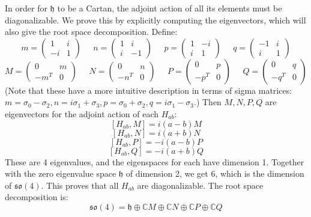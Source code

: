 \documentclass[12 pt]{article}
\newcommand{\C}{\mathbb{C}}
\newcommand{\fr}{\mathfrak}
\begin{document}
In order for $\fr h$ to be a Cartan, the adjoint action of all its elements must be diagonalizable. We prove this by explicitly computing the eigenvectors, which will also give the root space decomposition. Define:
\[         m =  \left(  \begin{array} {cc}  1 & i \\ -i & 1  \end{array} \right)  \;\;\;\;\;  n = \left(  \begin{array} {cc}  1 & i \\ i &-1  \end{array} \right)  \;\;\;\;\;      p =  \left(  \begin{array} {cc}  1 & -i \\ i & 1  \end{array} \right)  \;\;\;\;\;  q = \left(  \begin{array} {cc}  -1 & i \\ i & 1  \end{array} \right) \]
\[      M =  \left(  \begin{array} {cc}  0 & m \\ -m^T & 0  \end{array} \right)  \;\;\;\;\;   N =  \left(  \begin{array} {cc}  0 & n \\ -n^T & 0  \end{array} \right)  \;\;\;\;\;  P =  \left(  \begin{array} {cc}  0 & p \\ -p^T & 0  \end{array} \right)  \;\;\;\;\;  Q =  \left(  \begin{array} {cc}  0 & q \\ -q^T & 0  \end{array} \right)  \;\;\;\;\; \]
(Note that these have a more intuitive description in terms of sigma matrices: $m = \sigma_0 - \sigma_2 , n = i \sigma_1 + \sigma_3, p =  \sigma_0 + \sigma_2, q = i \sigma_1 - \sigma_3$.) Then $M, N, P, Q$ are eigenvectors for the adjoint action of each $H_{ab}$:
\[       [H_{ab}, M] = i (a-b) M      \]
\[       [H_{ab}, N] = i (a+b) N      \]
\[       [H_{ab}, P] = -i (a-b) P      \]
\[       [H_{ab}, Q] = -i (a+b) Q         \]
These are 4 eigenvalues, and the eigenspaces for each have dimension 1. Together with the zero eigenvalue space $\fr h$ of dimension 2, we get 6, which is the dimension of $\fr{so}(4)$. This proves that all $H_{ab}$ are diagonalizable. The root space decomposition is:
\[        \fr{so}(4) = \fr{h} \oplus \C M \oplus \C N \oplus \C P \oplus \C Q       \]
\end{document}
